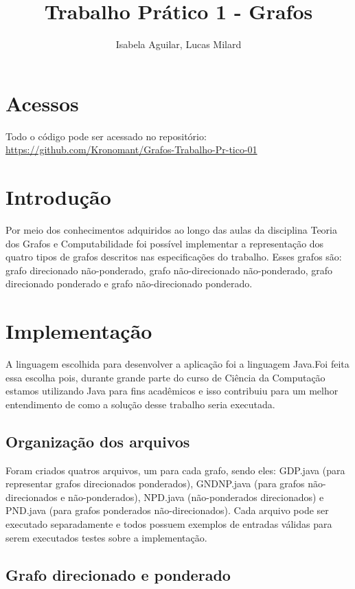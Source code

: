 \documentclass[12pt]{article}
\title{Trabalho Prático 1 - Grafos}
\author{Isabela Aguilar, Lucas Milard}
\begin{document}
 

\maketitle
\section{Acessos}

Todo o código pode ser acessado no repositório:
\url{https://github.com/Kronomant/Grafos-Trabalho-Pr-tico-01}

\section{Introdução}

Por meio dos conhecimentos adquiridos ao longo das aulas da disciplina Teoria dos Grafos e Computabilidade foi possível implementar a representação dos quatro tipos de grafos descritos nas especificações do trabalho. Esses grafos são: grafo direcionado não-ponderado, grafo não-direcionado não-ponderado, grafo direcionado ponderado e grafo não-direcionado ponderado.

\section{Implementação}
A linguagem escolhida para desenvolver a aplicação foi a linguagem Java.Foi feita essa escolha pois, durante grande parte do curso de Ciência da Computação estamos utilizando Java para fins acadêmicos e isso contribuiu para um melhor entendimento de como a solução desse trabalho seria executada.

\subsection{Organização dos arquivos}

Foram criados quatros arquivos, um para cada grafo, sendo eles: GDP.java (para representar grafos direcionados ponderados), GNDNP.java (para grafos não-direcionados e não-ponderados), NPD.java (não-ponderados direcionados) e PND.java (para grafos ponderados não-direcionados). Cada arquivo pode ser executado separadamente e todos possuem exemplos de entradas válidas para serem executados testes sobre a implementação.

\subsection{Grafo direcionado e ponderado}
\end{document}

